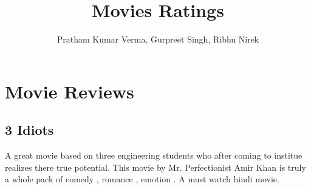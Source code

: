 \documentclass{article}
\title{Movies Ratings}
\author{Pratham Kumar Verma, Gurpreet Singh, Ribhu Nirek}
\date{}
\begin{document}
\maketitle

\section*{Movie Reviews}
\subsection*{3 Idiots}
    A great movie based on three engineering students who after coming to institue realizes there true potential.
This movie by Mr. Perfectionist Amir Khan is truly a whole pack of comedy , romance , emotion . A must watch hindi movie. 
\end{document}
